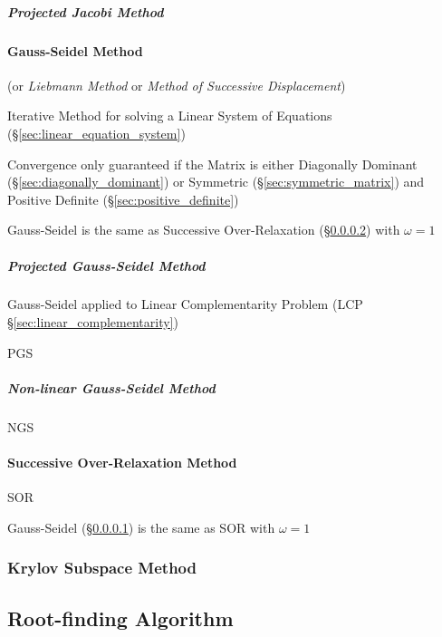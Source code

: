 \subparagraph{Projected Jacobi Method}
\label{sec:projected_jacobi_method}



\paragraph{Gauss-Seidel Method}\label{sec:gauss_seidel}\hfill

(or \emph{Liebmann Method} or \emph{Method of Successive
  Displacement})

Iterative Method for solving a Linear System of Equations
(\S\ref{sec:linear_equation_system})

Convergence only guaranteed if the Matrix is either Diagonally
Dominant (\S\ref{sec:diagonally_dominant}) or Symmetric
(\S\ref{sec:symmetric_matrix}) and Positive Definite
(\S\ref{sec:positive_definite})

Gauss-Seidel is the same as Successive Over-Relaxation
(\S\ref{sec:successive_over_relaxation}) with $\omega = 1$



\subparagraph{Projected Gauss-Seidel Method}\hfill
\label{sec:projected_gauss_seidel}

Gauss-Seidel applied to Linear Complementarity Problem (LCP
\S\ref{sec:linear_complementarity})

PGS



\subparagraph{Non-linear Gauss-Seidel Method}
\label{sec:nonlinear_gauss_seidel}

NGS



\paragraph{Successive Over-Relaxation Method}
\label{sec:successive_over_relaxation}\hfill

SOR

Gauss-Seidel (\S\ref{sec:gauss_seidel}) is the same as SOR with $\omega = 1$



\subsubsection{Krylov Subspace Method}\label{sec:krylov_subspace_method}



\subsection{Root-finding Algorithm}\label{sec:root_finding}

